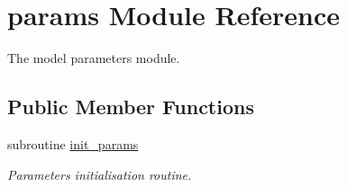 \hypertarget{classparams}{\section{params Module Reference}
\label{classparams}
}


The model parameters module.  


\subsection*{Public Member Functions}
\begin{DoxyCompactItemize}
\item 
subroutine \hyperlink{classparams_aa5d1f7f88b00cf3705691de2f6f92a08}{init\-\_\-params}
\begin{DoxyCompactList}\small\item\em Parameters initialisation routine. \end{DoxyCompactList}\end{DoxyCompactItemize}

